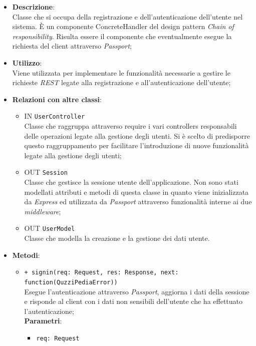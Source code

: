\begin{itemize}
	\item 
	\textbf{Descrizione}:\\
	Classe che si occupa della registrazione e dell'autenticazione dell'utente nel sistema. È un componente ConcreteHandler del design pattern \textit{Chain of responsibility}. Risulta essere il componente che eventualmente esegue la richiesta del client attraverso \textit{Passport};
	\item
	\textbf{Utilizzo}:\\
	Viene utilizzata per implementare le funzionalità necessarie a gestire le richieste \textit{REST} legate alla registrazione e all'autenticazione dell'utente;
	\item
	\textbf{Relazioni con altre classi}:
	\begin{itemize}
		\item
		IN \texttt{UserController} \\
		Classe che raggruppa attraverso require i vari controllers responsabili delle operazioni legate alla gestione degli utenti. Si è scelto di predisporre questo raggruppamento per facilitare l'introduzione di nuove funzionalità legate alla gestione degli utenti;
		\item
		OUT \texttt{Session} \\
		Classe che gestisce la sessione utente dell'applicazione. Non sono stati modellati attributi e metodi di questa classe in quanto viene inizializzata da \textit{Express} ed utilizzata da \textit{Passport} attraverso funzionalità interne ai due \textit{middleware};
		\item
		OUT \texttt{UserModel} \\
		Classe che modella la creazione e la gestione dei dati utente.
	\end{itemize}
	\item
	\textbf{Metodi}:
	\begin{itemize}
		\item
		\texttt{+ signin(req: Request, res: Response, next: function(QuzziPediaError))} \\
		Esegue l'autenticazione attraverso \textit{Passport}, aggiorna i dati della sessione e risponde al client con i dati non sensibili dell'utente che ha effettuato l'autenticazione; \\
		\textbf{Parametri}:
		 \begin{itemize}
		  \item
			\texttt{req: Request} \\

\end{itemize}
\end{itemize}
\end{itemize}
